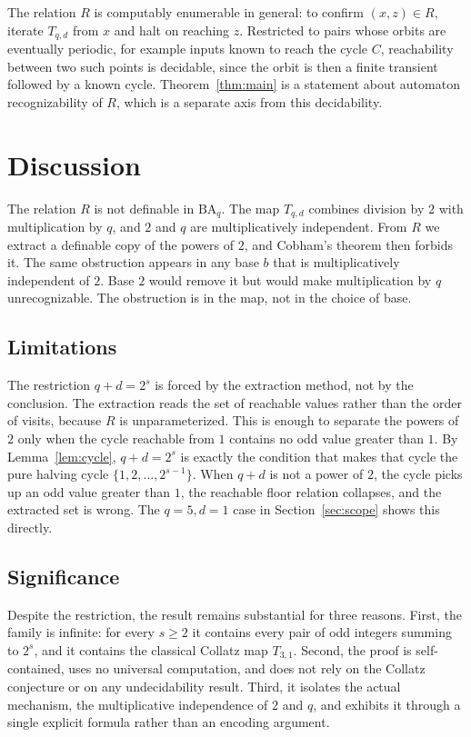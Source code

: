 \documentclass[runningheads]{llncs}
\begin{document}
\begin{remark}
The relation $R$ is computably enumerable in general: to confirm
$(x,z) \in R$, iterate $T_{q,d}$ from $x$ and halt on reaching $z$.
Restricted to pairs whose orbits are eventually periodic, for example
inputs known to reach the cycle $C$, reachability between two such points
is decidable, since the orbit is then a finite transient followed by a
known cycle. Theorem~\ref{thm:main} is a statement about automaton
recognizability of $R$, which is a separate axis from this
decidability.
\end{remark}

\section{Discussion}
\label{sec:discussion}

The relation $R$ is not definable in $\mathrm{BA}_q$. The map $T_{q,d}$ combines division by $2$ with multiplication
by $q$, and $2$ and $q$ are multiplicatively independent. From $R$ we
extract a definable copy of the powers of $2$, and Cobham's theorem then
forbids it. The same obstruction appears in any base $b$ that is
multiplicatively independent of $2$. Base $2$ would remove it but would
make multiplication by $q$ unrecognizable. The obstruction is in the
map, not in the choice of base.

\subsection{Limitations}

The restriction $q+d = 2^s$ is forced by the extraction method, not by
the conclusion. The extraction reads the set of reachable values rather
than the order of visits, because $R$ is unparameterized. This is enough
to separate the powers of $2$ only when the cycle reachable from $1$
contains no odd value greater than $1$. By Lemma~\ref{lem:cycle}, $q+d =
2^s$ is exactly the condition that makes that cycle the pure halving
cycle $\{1,2,\dots,2^{s-1}\}$. When $q+d$ is not a power of $2$, the
cycle picks up an odd value greater than $1$, the reachable floor relation
collapses, and the extracted set is wrong. The $q=5,d=1$ case in
Section~\ref{sec:scope} shows this directly. 

\subsection{Significance}
Despite the restriction, the result remains substantial for three reasons. First, the family is
infinite: for every $s \ge 2$ it contains every pair of odd integers
summing to $2^s$, and it contains the classical Collatz map $T_{3,1}$.
Second, the proof is self-contained, uses no universal computation, and
does not rely on the Collatz conjecture or on any undecidability result.
Third, it isolates the actual mechanism, the multiplicative
independence of $2$ and $q$, and exhibits it through a single explicit
formula rather than an encoding argument.
\end{document}
